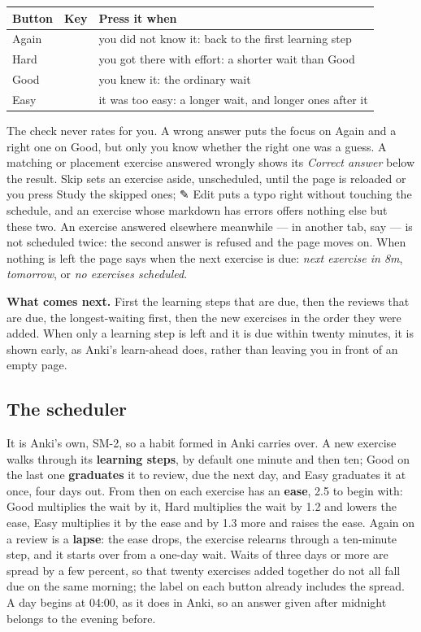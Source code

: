 \documentclass[11pt,oneside]{report}
\newcommand{\sym}[1]{{\symfont #1}}
\newcommand{\key}[1]{\textsf{\small\fbox{#1}}}
\newcommand{\menu}[1]{\textsf{#1}}
\begin{document}
\begin{center}
\begin{tabular}{@{}llp{}@{}}
\toprule
\textsf{Button} & \textsf{Key} & \textsf{Press it when} \\
\midrule
\menu{Again} & \key{1} & you did not know it: back to the first learning step \\
\menu{Hard}  & \key{2} & you got there with effort: a shorter wait than Good \\
\menu{Good}  & \key{3} & you knew it: the ordinary wait \\
\menu{Easy}  & \key{4} & it was too easy: a longer wait, and longer ones after it \\
\bottomrule
\end{tabular}
\end{center}

The check never rates for you. A wrong answer puts the focus on
\menu{Again} and a right one on \menu{Good}, but only you know whether the
right one was a guess. A matching or placement exercise answered wrongly
shows its \emph{Correct answer} below the result. \menu{Skip} sets an
exercise aside, unscheduled, until the page is reloaded or you press
\menu{Study the skipped ones}; \menu{\sym{✎} Edit} puts a typo right without
touching the schedule, and an exercise whose markdown has errors offers
nothing else but these two. An exercise answered elsewhere meanwhile --- in
another tab, say --- is not scheduled twice: the second answer is refused and
the page moves on. When nothing is left the page says when the next
exercise is due: \emph{next exercise in 8m}, \emph{tomorrow}, or \emph{no
exercises scheduled}.

\textbf{What comes next.} First the learning steps that are due, then the
reviews that are due, the longest-waiting first, then the new exercises in
the order they were added. When only a learning step is left and it is due
within twenty minutes, it is shown early, as Anki's learn-ahead does, rather
than leaving you in front of an empty page.

\subsection*{The scheduler}

It is Anki's own, SM-2, so a habit formed in Anki carries over. A new
exercise walks through its \textbf{learning steps}, by default one minute
and then ten; \menu{Good} on the last one \textbf{graduates} it to review,
due the next day, and \menu{Easy} graduates it at once, four days out. From
then on each exercise has an \textbf{ease}, 2.5 to begin with: \menu{Good}
multiplies the wait by it, \menu{Hard} multiplies the wait by 1.2 and lowers
the ease, \menu{Easy} multiplies it by the ease and by 1.3 more and raises
the ease. \menu{Again} on a review is a \textbf{lapse}: the ease drops, the
exercise relearns through a ten-minute step, and it starts over from a
one-day wait. Waits of three days or more are spread by a few percent, so
that twenty exercises added together do not all fall due on the same
morning; the label on each button already includes the spread. A day begins
at 04:00, as it does in Anki, so an answer given after midnight belongs to
the evening before.
\end{document}
